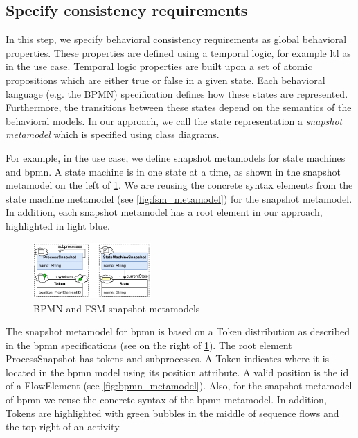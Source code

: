 \documentclass{jot}
\begin{document}
\subsection{Specify consistency requirements} \label{subsec:specify_consistency_requirements}
In this step, we specify behavioral consistency requirements as global behavioral properties.
These properties are defined using a temporal logic, for example \gls*{ltl} as in the use case.
Temporal logic properties are built upon a set of atomic propositions which are either true or false in a given state.
Each behavioral language (e.g. the BPMN) specification defines how these states are represented.
Furthermore, the transitions between these states depend on the semantics of the behavioral models.
In our approach, we call the state representation a \emph{snapshot metamodel} which is specified using class diagrams.

For example, in the use case, we define snapshot metamodels for state machines and \gls*{bpmn}.
A state machine is in one state at a time, as shown in the snapshot metamodel on the left of \cref{fig:snapshot_metamodels}.
We are reusing the concrete syntax elements from the state machine metamodel (see \cref{fig:fsm_metamodel}) for the snapshot metamodel.
In addition, each snapshot metamodel has a root element in our approach, highlighted in light blue.
\begin{figure}[h]
    \centering
    \includegraphics[width=0.4\textwidth]{figures/snapshot_metamodels.pdf}
    \caption{BPMN and FSM snapshot metamodels}
    \label{fig:snapshot_metamodels}
\end{figure}

The snapshot metamodel for \gls*{bpmn} is based on a \textsf{Token} distribution as described in the \gls*{bpmn} specifications \cite{objectmanagementgroupBusinessProcessModel2013} (see on the right of \cref{fig:snapshot_metamodels}).
The root element \textsf{ProcessSnapshot} has \textsf{tokens} and \textsf{subprocesses}.
A \textsf{Token} indicates where it is located in the \gls*{bpmn} model using its \textsf{position} attribute.
A valid \textsf{position} is the \textsf{id} of a \textsf{FlowElement} (see \cref{fig:bpmn_metamodel}).
Also, for the snapshot metamodel of \gls*{bpmn} we reuse the concrete syntax of the \gls*{bpmn} metamodel.
In addition, \textsf{Token}s are highlighted with green bubbles in the middle of sequence flows and the top right of an activity.
\end{document}
